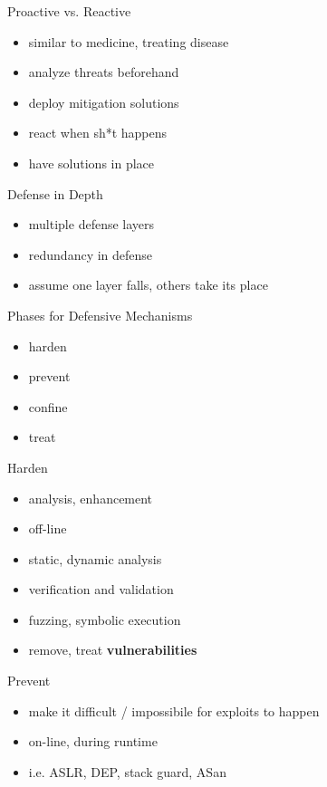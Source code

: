 \documentclass{curs}
\begin{document}
\begin{frame}{Proactive vs. Reactive}
  \begin{itemize}
    \item similar to medicine, treating disease
    \item analyze threats beforehand
    \item deploy mitigation solutions
    \item react when sh*t happens
    \item have solutions in place
  \end{itemize}
\end{frame}

\begin{frame}{Defense in Depth}
  \begin{itemize}
    \item multiple defense layers
    \item redundancy in defense
    \item assume one layer falls, others take its place
  \end{itemize}
\end{frame}

\begin{frame}{Phases for Defensive Mechanisms}
  \begin{itemize}
    \item harden
    \item prevent
    \item confine
    \item treat
  \end{itemize}
\end{frame}

\begin{frame}{Harden}
  \begin{itemize}
    \item analysis, enhancement
    \item off-line
    \item static, dynamic analysis
    \item verification and validation
    \item fuzzing, symbolic execution
    \item remove, treat \textbf{vulnerabilities}
  \end{itemize}
\end{frame}

\begin{frame}{Prevent}
  \begin{itemize}
    \item make it difficult / impossibile for exploits to happen
    \item on-line, during runtime
    \item i.e. ASLR, DEP, stack guard, ASan
  \end{itemize}
\end{frame}
\end{document}
